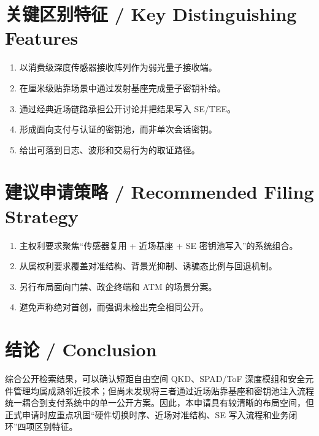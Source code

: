﻿\documentclass[12pt,a4paper]{article}
\begin{document}
\section{关键区别特征 / Key Distinguishing Features}
\begin{enumerate}
\item 以消费级深度传感器接收阵列作为弱光量子接收端。
\item 在厘米级贴靠场景中通过发射基座完成量子密钥补给。
\item 通过经典近场链路承担公开讨论并把结果写入 SE/TEE。
\item 形成面向支付与认证的密钥池，而非单次会话密钥。
\item 给出可落到日志、波形和交易行为的取证路径。
\end{enumerate}

\section{建议申请策略 / Recommended Filing Strategy}
\begin{enumerate}
\item 主权利要求聚焦“传感器复用 + 近场基座 + SE 密钥池写入”的系统组合。
\item 从属权利要求覆盖对准结构、背景光抑制、诱骗态比例与回退机制。
\item 另行布局面向门禁、政企终端和 ATM 的场景分案。
\item 避免声称绝对首创，而强调未检出完全相同公开。
\end{enumerate}

\section{结论 / Conclusion}
综合公开检索结果，可以确认短距自由空间 QKD、SPAD/ToF 深度模组和安全元件管理均属成熟邻近技术；但尚未发现将三者通过近场贴靠基座和密钥池注入流程统一耦合到支付系统中的单一公开方案。因此，本申请具有较清晰的布局空间，但正式申请时应重点巩固“硬件切换时序、近场对准结构、SE 写入流程和业务闭环”四项区别特征。
\end{document}
